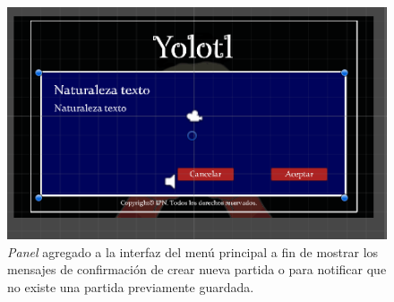 \begin{figure}[h]
        \centering
        \includegraphics[height=0.2 \textheight]{03TrabajoRealizado/imagenes/menuctrlPanel.png}
        \caption{\textit{Panel} agregado a la interfaz del menú principal a fin
        de mostrar los mensajes de confirmación de crear nueva partida o para
        notificar que no existe una partida previamente guardada.}
        \label{fig:menuctrlPanel}
\end{figure}
 
